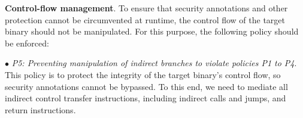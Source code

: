 


\vspace{3pt}\noindent\textbf{Control-flow management}. 
To ensure that security annotations and other protection cannot be circumvented at runtime, the control flow of the target binary should not be manipulated. For this purpose, the following policy should be enforced:  


\vspace{2pt}\noindent$\bullet$\textit{ P5: Preventing manipulation of indirect branches to violate policies P1 to P4}. This policy is to protect the integrity of the target binary's control flow, so security annotations cannot be bypassed. To this end, we need to mediate all indirect control transfer instructions, including indirect calls and jumps, and return instructions.



